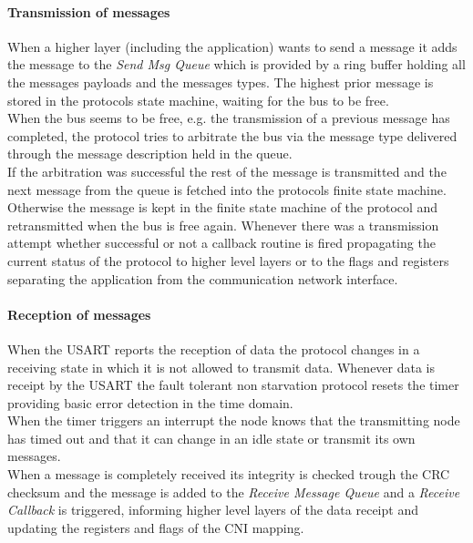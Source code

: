 \paragraph{Transmission of messages}
When a higher layer (including the application) wants to send a message it adds the message to the \textit{Send Msg Queue} which is provided
by a ring buffer holding all the messages payloads and the messages types. The highest prior message is stored in the protocols state machine, waiting for the bus to be free.\\

When the bus seems to be free, e.g. the transmission of a previous message has completed, the protocol tries to arbitrate the bus via the message type delivered through the message description held in the queue.\\

If the arbitration was successful the rest of the message is transmitted and the next message from the queue is fetched into the protocols finite state machine. Otherwise the message is kept in the finite state machine of the protocol and retransmitted when the bus is free again.
Whenever there was a transmission attempt whether successful or not a callback routine is fired propagating the current status of the protocol to higher level layers or to the flags and registers separating the application from the communication network interface.\\

\paragraph{Reception of messages}
When the USART reports the reception of data the protocol changes in a receiving state in which it is not allowed to transmit data.
Whenever data is receipt by the USART the fault tolerant non starvation protocol resets the timer providing basic error detection in the time domain.\\

When the timer triggers an interrupt the node knows that the transmitting node has timed out and that it can change in an idle state or transmit its own messages.\\

When a message is completely received its integrity is checked trough the CRC checksum and the message is added to the \textit{Receive Message Queue} and a \textit{Receive Callback} is triggered, informing higher level layers of the data receipt and updating the registers and flags of the CNI mapping.


